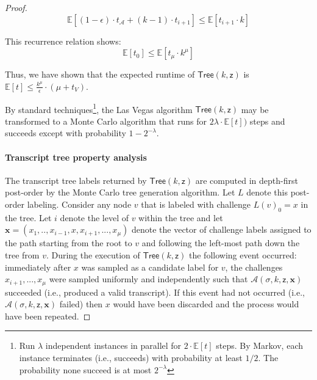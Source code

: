 \documentclass{article}
\theoremstyle{definition}
\begin{document}
\begin{proof}
$$ \mathbb{E}[(1- \epsilon)\cdot t_\mathcal{A} +  (k-1)\cdot t_{i+1}]  \leq \mathbb{E}[t_{i+1} \cdot k]$$

This recurrence relation shows: 
$$\mathbb{E}[t_0] \leq \mathbb{E}[t_\mu \cdot k^\mu] $$

Thus, we have shown that the expected runtime of $\mathsf{Tree}(k,\mathsf{z})$ is $\mathbb{E}[t] \leq \frac{k^\mu}{\epsilon} \cdot (\mu + t_V)$.

\medskip 

By standard techniques\footnote{Run $\lambda$ independent instances in parallel for $2 \cdot \mathbb{E}[t]$ steps. By Markov, each instance terminates (i.e., succeeds) with probability at least $1/2$. The probability none succeed is at most $2^{-\lambda}$}, the Las Vegas algorithm $\mathsf{Tree}(k,\mathsf{z})$ may be transformed to a Monte Carlo algorithm that runs for $2\lambda \cdot \mathbb{E}[t])$ steps and succeeds except with probability $1-2^{-\lambda}$.

\paragraph{Transcript tree property analysis} 
The transcript tree labels returned by $\mathsf{Tree}(k,\mathsf{z})$ are computed in depth-first post-order by the Monte Carlo tree generation algorithm. Let $L$ denote this post-order labeling. Consider any node $v$ that is labeled with challenge $L(v)_0 = x$ in the tree. Let $i$ denote the level of $v$ within the tree and let $\mathbf{x} = (x_1,..,x_{i-1}, x, x_{i+1},...,x_\mu)$ denote the vector of challenge labels assigned to the path starting from the root to $v$ and following the left-most path down the tree from $v$. During the execution of $\mathsf{Tree}(k, \mathsf{z})$ the following event occurred: immediately after $x$ was sampled as a candidate label for $v$, the challenges $x_{i+1},...,x_\mu$ were sampled uniformly and independently such that $\mathcal{A}(\sigma, k, \mathsf{z}, \mathbf{x})$ succeeded (i.e., produced a valid transcript). If this event had not occurred (i.e., $\mathcal{A}(\sigma, k, \mathsf{z}, \mathbf{x})$ failed) then $x$ would have been discarded and the process would have been repeated. 


\end{proof}
\end{document}
